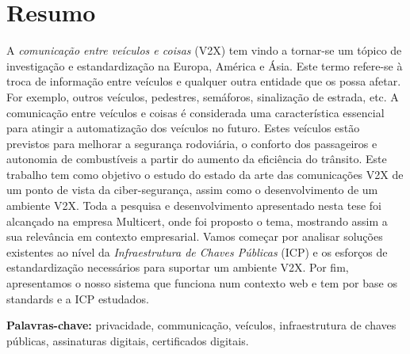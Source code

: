 
\section*{Resumo}

A \textit{comunicação entre veículos e coisas} (V2X) tem vindo a tornar-se um tópico de investigação e estandardização na Europa, América e Ásia. Este termo refere-se à troca de informação entre veículos e qualquer outra entidade que os possa afetar. For exemplo, outros veículos, pedestres, semáforos, sinalização de estrada, etc. A comunicação entre veículos e coisas é considerada uma característica essencial para atingir a automatização dos veículos no futuro. Estes veículos estão previstos para melhorar a segurança rodoviária, o conforto dos passageiros e autonomia de combustíveis a partir do aumento da eficiência do trânsito. Este trabalho tem como objetivo o estudo do estado da arte das comunicações V2X de um ponto de vista da ciber-segurança, assim como o desenvolvimento de um ambiente V2X. Toda a pesquisa e desenvolvimento apresentado nesta tese foi alcançado na empresa Multicert, onde foi proposto o tema, mostrando assim a sua relevância em contexto empresarial.
Vamos começar por analisar soluções existentes ao nível da \textit{Infraestrutura de Chaves Públicas} (ICP) e os esforços de estandardização necessários para suportar um ambiente V2X. Por fim, apresentamos o nosso sistema que funciona num contexto web e tem por base os standards e a ICP
estudados.

\vfill

\textbf{\Large Palavras-chave:} privacidade, communicação, veículos, infraestrutura de chaves públicas, assinaturas digitais, certificados digitais.


